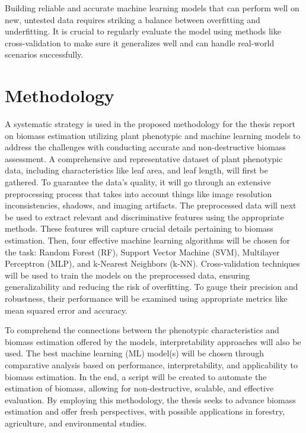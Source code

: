 \documentclass[a4paper,12pt]{report}%
\renewcommand{\\}{\vspace*{0.5\baselineskip} \newline}
\begin{document}
\noindent Building reliable and accurate machine learning models that can perform well on new, untested data requires striking a balance between overfitting and underfitting. It is crucial to regularly evaluate the model using methods like cross-validation to make sure it generalizes well and can handle real-world scenarios successfully.



\chapter{Methodology}
A systematic strategy is used in the proposed methodology for the thesis report on biomass estimation utilizing plant phenotypic and machine learning models to address the challenges with conducting accurate and non-destructive biomass assessment. A comprehensive and representative dataset of plant phenotypic data, including characteristics like leaf area, and leaf length, will first be gathered. To guarantee the data's quality, it will go through an extensive preprocessing process that takes into account things like image resolution inconsistencies, shadows, and imaging artifacts. The preprocessed data will next be used to extract relevant and discriminative features using the appropriate methods. These features will capture crucial details pertaining to biomass estimation. Then, four effective machine learning algorithms will be chosen for the task: Random Forest (RF), Support Vector Machine (SVM), Multilayer Perceptron (MLP), and k-Nearest Neighbors (k-NN). Cross-validation techniques will be used to train the models on the preprocessed data, ensuring generalizability and reducing the risk of overfitting. To gauge their precision and robustness, their performance will be examined using appropriate metrics like mean squared error and accuracy.

\noindent To comprehend the connections between the phenotypic characteristics and biomass estimation offered by the models, interpretability approaches will also be used. The best machine learning (ML) model(s) will be chosen through comparative analysis based on performance, interpretability, and applicability to biomass estimation. In the end, a script will be created to automate the estimation of biomass, allowing for non-destructive, scalable, and effective evaluation. By employing this methodology, the thesis seeks to advance biomass estimation and offer fresh perspectives, with possible applications in forestry, agriculture, and environmental studies.
\end{document}
